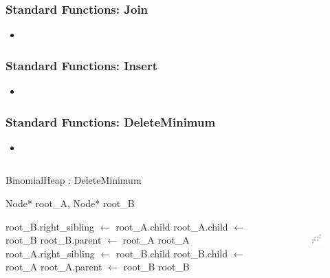 \documentclass[13pt]{beamer}
\begin{document}
\begin{frame}
\frametitle{Standard Functions: Join}
  \begin{itemize}
    \item
  \end{itemize}
\end{frame}

\begin{frame}
\frametitle{Standard Functions: Insert}
  \begin{itemize}
    \item
  \end{itemize}
\end{frame}

\begin{frame}
\frametitle{Standard Functions: DeleteMinimum}
  \begin{itemize}
    \item
  \end{itemize}

  \begin{columns}[T] %
    \begin{column}[T]{6cm} %
        \begin{algorithm}[H]
        \small
        \caption{BinomialHeap : DeleteMinimum}
        \begin{algorithmic}
          \REQUIRE Node* root\_A, Node* root\_B

            \STATE root\_B.right\_sibling $\leftarrow$ root\_A.child
            \STATE root\_A.child $\leftarrow$ root\_B
            \STATE root\_B.parent $\leftarrow$ root\_A
            \RETURN root\_A
          \ELSE
            \STATE root\_A.right\_sibling $\leftarrow$ root\_B.child
            \STATE root\_B.child $\leftarrow$ root\_A
            \STATE root\_A.parent $\leftarrow$ root\_B
            \RETURN root\_B
          \ENDIF
        \end{algorithmic}
        \end{algorithm}
    \end{column}
    \begin{column}[T]{5.5cm} %
      \begin{figure}
        \includegraphics[height=5cm]{./img/postmerge.png}
      \end{figure}
    \end{column}
  \end{columns}
\end{frame}
\end{document}
